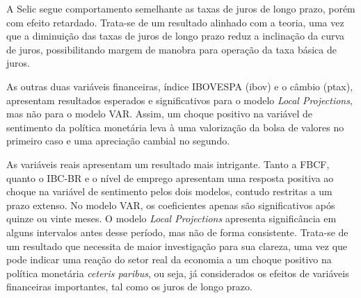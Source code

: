 A Selic segue comportamento semelhante as taxas de juros de longo prazo, porém com efeito retardado. Trata-se de um resultado alinhado com a teoria, uma vez que a diminuição das taxas de juros de longo prazo reduz a inclinação da curva de juros, possibilitando margem de manobra para operação da taxa básica de juros. 

As outras duas variáveis financeiras, índice IBOVESPA (ibov) e o câmbio (ptax), apresentam resultados esperados e significativos para o modelo \textit{Local Projections}, mas não para o modelo VAR. Assim, um choque positivo na variável de sentimento da política monetária leva à uma valorização da bolsa de valores no primeiro caso e uma apreciação cambial no segundo. 

As variáveis reais apresentam um resultado mais intrigante. Tanto a FBCF, quanto o IBC-BR e o nível de emprego apresentam uma resposta positiva ao choque na variável de sentimento pelos dois modelos, contudo restritas a um prazo extenso. No modelo VAR, os coeficientes apenas são significativos após quinze ou vinte meses. O modelo \textit{Local Projections} apresenta significância em alguns intervalos antes desse período, mas não de forma consistente. Trata-se de um resultado que necessita de maior investigação para sua clareza, uma vez que pode indicar uma reação do setor real da economia a um choque positivo na política monetária \textit{ceteris paribus}, ou seja, já considerados os efeitos de variáveis financeiras importantes, tal como os juros de longo prazo. 





\bigskip